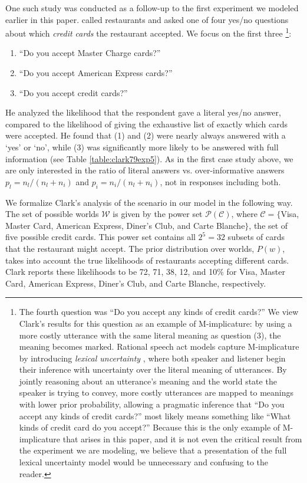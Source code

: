 \documentclass[12pt, floatsintext, jou]{apa6}
\begin{document}
One such study was conducted as a follow-up to the first experiment we modeled earlier in this paper.   called restaurants and asked one of four yes/no questions about which \emph{credit cards} the restaurant accepted. We focus on the first three
\footnote{The fourth question was ``Do you accept any kinds of credit cards?'' We view Clark's results for this question as an example of M-implicature: by using a more costly utterance with the same literal meaning as question (3), the meaning becomes marked. Rational speech act models capture M-implicature by introducing \emph{lexical uncertainty} \cite{BergenGoodmanLevy12_Alternatives}, where both speaker and listener begin their inference with uncertainty over the literal meaning of utterances. By jointly reasoning about an utterance's meaning and the world state the speaker is trying to convey, more costly utterances are mapped to meanings with lower prior probability, allowing a pragmatic inference that ``Do you accept any kinds of credit cards?'' most likely means something like ``What kinds of credit card do you accept?'' Because this is the only example of M-implicature that arises in this paper, and it is not even the critical result from the experiment we are modeling, we believe that a presentation of the full lexical uncertainty model would be unnecessary and confusing to the reader.}:

\begin{enumerate}
\item ``Do you accept Master Charge cards?'' 
\item ``Do you accept American Express cards?''
\item ``Do you accept credit cards?'' 
\end{enumerate}

He analyzed the likelihood that the respondent gave a literal yes/no answer, compared to the likelihood of giving the exhaustive list of exactly which cards were accepted.  He found that (1) and (2) were nearly always answered with a `yes' or `no', while (3) was significantly more likely to be answered with full information (see Table \ref{table:clark79exp5}). As in the first case study above, we are only interested in the ratio of literal answers vs. over-informative answers $p_l = n_l/(n_l + n_i)$ and $p_i = n_i/(n_l + n_i)$, not in responses including both. 

We formalize Clark's analysis of the scenario in our model in the following way. The set of possible worlds $\mathcal{W}$ is given by the power set $\mathcal{P}(\mathcal{C})$, where $\mathcal{C} = \{$Visa, Master Card, American Express, Diner's Club, and Carte Blanche$\}$, the set of five possible credit cards. This power set contains all $2^5 = 32$ subsets of cards that the restaurant might accept. The prior distribution over worlds, $P(w)$, takes into account the true likelihoods of restaurants accepting different cards. Clark reports these likelihoods to be 72, 71, 38, 12, and 10\% for Visa, Master Card, American Express, Diner's Club, and Carte Blanche, respectively. 
\end{document}
